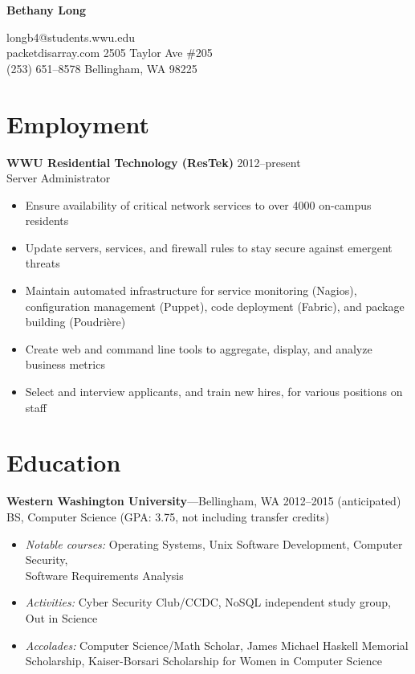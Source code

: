 \documentclass[11pt, letterpaper]{article}
\begin{document}
\clearpage
\thispagestyle{empty}

\begin{center}
\textbf{\huge{Bethany Long}}%
\end{center}

\small{
longb4@students.wwu.edu\\
packetdisarray.com \hfill 2505 Taylor Ave \#205\\
(253) 651--8578 \hfill Bellingham, WA 98225}

\hrulefill

\section*{Employment}

\textbf{WWU Residential Technology (ResTek)} \hfill 2012--present\\
Server Administrator

\begin{itemize}
    \item Ensure availability of critical network services to over 4000 on-campus residents
    \item Update servers, services, and firewall rules to stay secure against emergent threats
    \item Maintain automated infrastructure for service monitoring (Nagios), configuration management (Puppet), code deployment (Fabric), and package building (Poudri\`{e}re)
    \item Create web and command line tools to aggregate, display, and analyze business metrics
    \item Select and interview applicants, and train new hires, for various positions on staff
\end{itemize}

\section*{Education}

\textbf{Western Washington University}---Bellingham, WA \hfill 2012--2015 (anticipated)\\
BS, Computer Science (GPA: 3.75, not including transfer credits)

\begin{itemize}
    \item \textit{Notable courses:} Operating Systems, Unix Software Development, Computer Security, \\Software Requirements Analysis
    \item \textit{Activities:} Cyber Security Club/CCDC, NoSQL independent study group, Out in Science
    \item \textit{Accolades:} Computer Science/Math Scholar, James Michael Haskell Memorial Scholarship, Kaiser-Borsari Scholarship for Women in Computer Science
\end{itemize}
\end{document}
